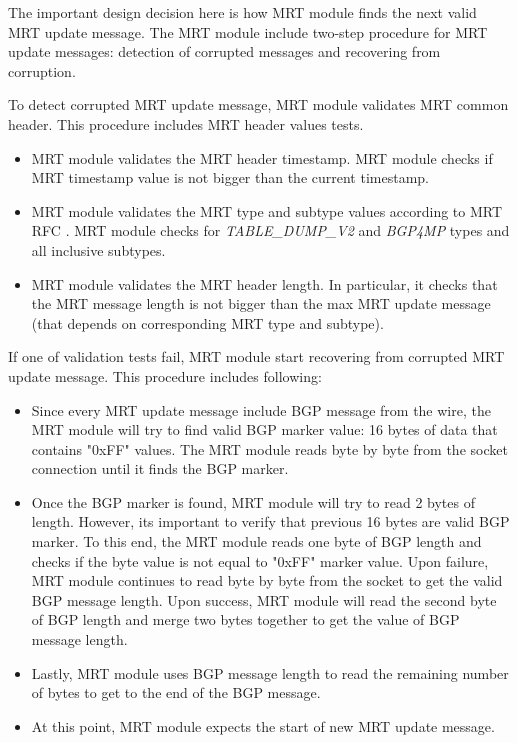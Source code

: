 



The important design decision here is how MRT module finds the next valid MRT update message. The MRT module include two-step procedure for MRT update messages: detection of corrupted messages and recovering from corruption. 

To detect corrupted MRT update message, MRT module validates MRT common header. This procedure includes MRT header values tests. 
\begin{itemize}
\item{MRT module validates the MRT header timestamp. MRT module checks if MRT timestamp value is not bigger than the current timestamp. }
\item{MRT module validates the MRT type and subtype values according to MRT RFC \cite{mrt}. MRT module checks for \emph{TABLE\_DUMP\_V2} and \emph{BGP4MP} types and all inclusive subtypes.}
\item{MRT module validates the MRT header length. In particular, it checks that the MRT message length is not bigger than the max MRT update message (that depends on corresponding MRT type and subtype). }
\end{itemize}

If one of validation tests fail, MRT module start recovering from corrupted MRT update message. This procedure includes following:

\begin{itemize}
\item{Since every MRT update message include BGP message from the wire, the MRT module will try to find valid BGP marker value: 16 bytes of data that contains "0xFF" values. The MRT module reads byte by byte from the socket connection until it finds the BGP marker. }
\item{Once the BGP marker is found, MRT module will try to read 2 bytes of length. However, its important to verify that previous 16 bytes are valid BGP marker. To this end, the MRT module reads one byte of BGP length and checks if the byte value is  not equal to "0xFF" marker value. Upon failure, MRT module continues to read byte by byte from the socket to get the valid BGP message length. Upon success, MRT module will read the second byte of BGP length and merge two bytes together to get the value of BGP message length. }
\item{Lastly, MRT module uses BGP message length to read the remaining number of bytes to get to the end of the BGP message.}
\item{At this point, MRT module expects the start of new MRT update message.}
\end{itemize}



